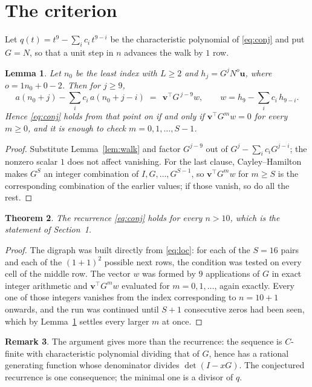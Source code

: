 \documentclass[11pt,a4paper]{article}
\theoremstyle{plain}
\newtheorem{theorem}{Theorem}
\newtheorem{lemma}[theorem]{Lemma}
\theoremstyle{definition}
\newtheorem{remark}[theorem]{Remark}
\begin{document}
\section{The criterion}

Let $q(t)=t^{9}-\sum_i c_i\,t^{9-i}$ be the characteristic polynomial of
\eqref{eq:conj} and put $G=N$, so that a unit step in $n$ advances the walk by
$1$ row.

\begin{lemma}\label{lem:crit}
Let $n_0$ be the least index with $L\ge2$ and $h_j=G^{j}N^{o}\mathbf{u}$, where
$o=1n_0+0-2$. Then for $j\ge9$,
\[
a(n_0+j)-\sum_i c_i\,a(n_0+j-i)\;=\;\,\mathbf{v}^{\!\top}G^{\,j-9}w,
\qquad w=h_{9}-\sum_i c_i\,h_{9-i} .
\]
Hence \eqref{eq:conj} holds from that point on if and only if
$\mathbf{v}^{\!\top}G^{m}w=0$ for every $m\ge0$, and it is enough to check
$m=0,1,\dots,S-1$.
\end{lemma}

\begin{proof}
Substitute Lemma~\ref{lem:walk} and factor $G^{j-9}$ out of
$G^{j}-\sum_ic_iG^{j-i}$; the nonzero scalar $1$ does not affect
vanishing. For the last clause, Cayley--Hamilton makes $G^{S}$ an integer combination of
$I,G,\dots,G^{S-1}$, so $\mathbf{v}^{\!\top}G^{m}w$ for $m\ge S$ is the corresponding
combination of the earlier values; if those vanish, so do all the rest.
\end{proof}

\begin{theorem}
The recurrence \eqref{eq:conj} holds for every $n>10$, which is the statement of
Section~1.
\end{theorem}

\begin{proof}
The digraph was built directly from \eqref{eq:loc}: for each of the $S=16$ pairs and each
of the $(1+1)^{2}$ possible next rows, the condition was tested on every cell of
the middle row. The vector $w$ was formed by $9$ applications of $G$ in exact integer
arithmetic and $\mathbf{v}^{\!\top}G^{m}w$ evaluated for $m=0,1,\dots$, again exactly.
Every one of those integers vanishes from the index corresponding to $n=10+1$ onwards,
and the run was continued until $S+1$ consecutive zeros had been seen, which by
Lemma~\ref{lem:crit} settles every larger $m$ at once.
\end{proof}

\begin{remark}
The argument gives more than the recurrence: the sequence is $C$-finite with characteristic
polynomial dividing that of $G$, hence has a rational generating function whose denominator
divides $\det(I-xG)$. The conjectured recurrence is one consequence; the minimal one is a
divisor of $q$.
\end{remark}
\end{document}
